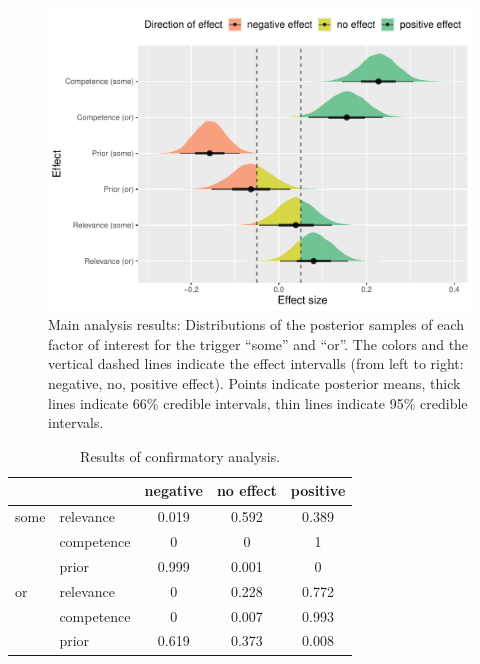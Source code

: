 \documentclass{sp}
\begin{document}
\begin{figure}[h]
	\begin{center}
		\includegraphics[width=1\linewidth]{images/posterior-effects-noDupl.pdf}
	\end{center}
	\vspace{-0.3cm}
	\caption{Main analysis results: Distributions of the posterior samples of each factor of interest for the trigger ``some'' and ``or''. The colors and the vertical dashed lines indicate the effect intervalls (from left to right: negative, no, positive effect). Points indicate posterior means, thick lines indicate 66\% credible intervals, thin lines indicate 95\% credible intervals.}
	\label{posteriors-main}
\end{figure}

\begin{table}
  \centering
   \begin{tabular}{llccc}
           &            & negative & no effect & positive \\ \midrule
    {some} & relevance  & 0.019    & 0.592       & 0.389      \\
           & competence & 0        & 0         & 1        \\
           & prior      & 0.999        & 0.001     & 0    \\
    {or}   & relevance  & 0     & 0.228       & 0.772      \\
           & competence & 0      & 0.007       & 0.993      \\
           & prior      & 0.619    & 0.373       & 0.008      \\
   \end{tabular}
  \caption{Results of confirmatory analysis.}
  \label{tab:results-confirmatory}
\end{table}
\end{document}
